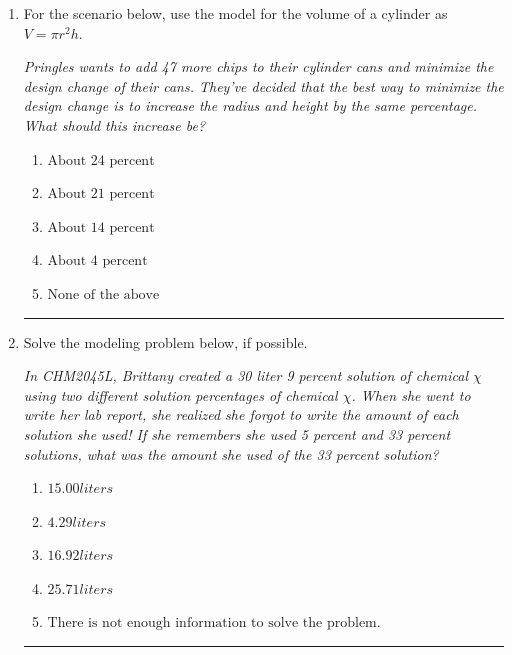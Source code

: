 \documentclass[14pt]{extbook}
\newcommand{\litem}[1]{\item#1\hspace*{-1cm}\rule{\textwidth}{0.4pt}}
\begin{document}
\begin{enumerate}
{\begin{enumerate}[label=\Alph*.]
\end{enumerate} }
\litem{
For the scenario below, use the model for the volume of a cylinder as $V = \pi r^2 h$.
\begin{center}
    \textit{ Pringles wants to add 47 \text{percent} more chips to their cylinder cans and minimize the design change of their cans. They've decided that the best way to minimize the design change is to increase the radius and height by the same percentage. What should this increase be? }
\end{center}
\begin{enumerate}[label=\Alph*.]
\item \( \text{About } 24 \text{ percent} \)
\item \( \text{About } 21 \text{ percent} \)
\item \( \text{About } 14 \text{ percent} \)
\item \( \text{About } 4 \text{ percent} \)
\item \( \text{None of the above} \)

\end{enumerate} }
\litem{
Solve the modeling problem below, if possible.
\begin{center}
    \textit{ In CHM2045L, Brittany created a 30 liter 9 percent solution of chemical $\chi$ using two different solution percentages of chemical $\chi$. When she went to write her lab report, she realized she forgot to write the amount of each solution she used! If she remembers she used 5 percent and 33 percent solutions, what was the amount she used of the 33 percent solution? }
\end{center}
\begin{enumerate}[label=\Alph*.]
\item \( 15.00 liters \)
\item \( 4.29 liters \)
\item \( 16.92 liters \)
\item \( 25.71 liters \)
\item \( \text{There is not enough information to solve the problem.} \)


\end{enumerate}}
\end{enumerate}
\end{document}
